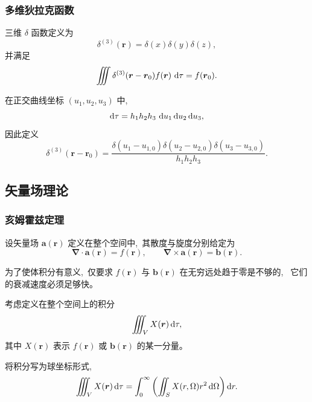 \subsubsection{多维狄拉克函数}

三维 $\delta$ 函数定义为
\begin{equation}
\delta^{(3)}(\boldsymbol r)
=
\delta(x)\delta(y)\delta(z),
\end{equation}
并满足
\begin{equation}
\iiint \delta^{(3)}(\boldsymbol r-\boldsymbol r_0)
f(\boldsymbol r)\,\dif\tau
=
f(\boldsymbol r_0).
\end{equation}


在正交曲线坐标 $(u_1,u_2,u_3)$ 中, \,
\[
\dif\tau = h_1 h_2 h_3 \,\dif u_1\dif u_2\dif u_3,
\]
因此定义
\begin{equation}
\delta^{(3)}(\boldsymbol r-\boldsymbol r_0)
=
\frac{
\delta(u_1-u_{1,0})
\delta(u_2-u_{2,0})
\delta(u_3-u_{3,0})
}{
h_1 h_2 h_3
}.
\end{equation}

\subsection{矢量场理论}
\subsubsection{亥姆霍兹定理}
设矢量场 $\boldsymbol a(\boldsymbol r)$ 定义在整个空间中, \,其散度与旋度分别给定为
\begin{equation*}
\boldsymbol{\nabla}\cdot\boldsymbol a(\boldsymbol r)=f(\boldsymbol r),
\qquad
\boldsymbol{\nabla}\times\boldsymbol a(\boldsymbol r)=\boldsymbol b(\boldsymbol r).
\end{equation*}

为了使体积分有意义, \,仅要求
$f(\boldsymbol r)$ 与 $\boldsymbol b(\boldsymbol r)$ 在无穷远处趋于零是不够的, \,
它们的衰减速度必须足够快。

考虑定义在整个空间上的积分
\begin{equation*}
\iiint_{V} X(\boldsymbol r)\dif\tau,
\end{equation*}
其中 $X(\boldsymbol r)$ 表示
$f(\boldsymbol r)$ 或 $\boldsymbol b(\boldsymbol r)$ 的某一分量。

将积分写为球坐标形式, \,
\begin{equation*}
\iiint_{V} X(\boldsymbol r)\dif\tau
=
\int_0^\infty
\left(
\iint_{S} X(r,\Omega) r^2\dif\Omega
\right)\dif r.
\end{equation*}

